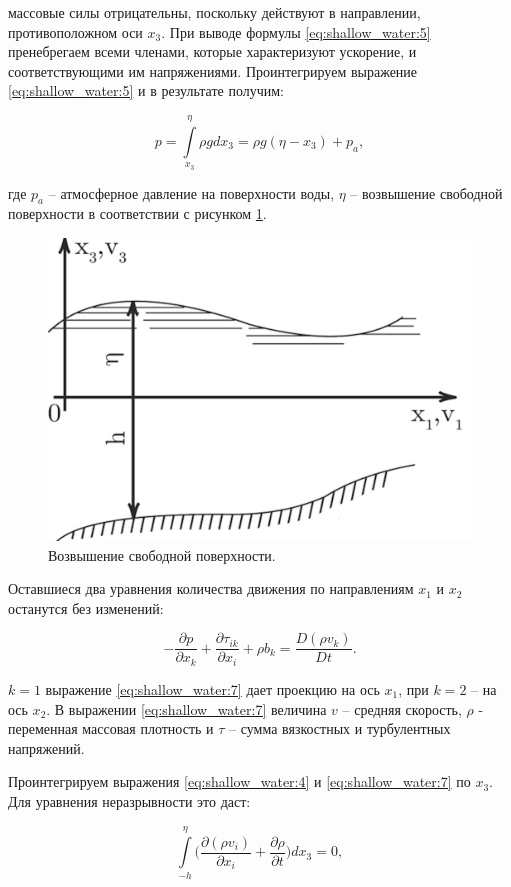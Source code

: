 \documentclass[14pt]{extreport}
\begin{document}
 массовые силы отрицательны, поскольку действуют в направлении, противоположном оси $x_3$. При выводе формулы \ref{eq:shallow_water:5} пренебрегаем всеми членами, которые характеризуют ускорение, и соответствующими им напряжениями. Проинтегрируем выражение \ref{eq:shallow_water:5} и в результате получим:

\begin{equation}\label{eq:shallow_water:6}
p = \int\limits^\eta_{x_3} \rho g dx_3 = \rho g (\eta-x_3)+p_a,
\end{equation}

\noindent где $p_a$ -- атмосферное давление на поверхности воды,
$\eta$ -- возвышение свободной поверхности в соответствии с рисунком \ref{img:shallow_water:1}.

\begin{figure}[H]
\centerline{\includegraphics[width=0.5\linewidth]{images/shallow_water_1}}
\caption{Возвышение свободной поверхности.}
\label{img:shallow_water:1}
\end{figure}

Оставшиеся два уравнения количества движения по направлениям $x_1$ и $x_2$ останутся без изменений:

\begin{equation}\label{eq:shallow_water:7}
-\frac{\partial p}{\partial x_k} + \frac{\partial \tau_{ik}}{\partial x_i} + \rho b_k = \frac{D(\rho v_k)}{Dt}.
\end{equation}

 $k=1$ выражение \ref{eq:shallow_water:7} дает проекцию на ось $x_1$, при $k=2$ -- на ось $x_2$. В выражении \ref{eq:shallow_water:7} величина $v$ -- средняя скорость, $\rho$ - переменная массовая плотность и $\tau$ -- сумма вязкостных и турбулентных напряжений.

Проинтегрируем выражения \ref{eq:shallow_water:4} и \ref{eq:shallow_water:7} по $x_3$. Для уравнения неразрывности это даст:

\begin{equation}\label{eq:shallow_water:8}
\int\limits^\eta_{-h} \bigg(\frac{\partial (\rho v_i)}{\partial x_i} + \frac{\partial \rho}{\partial t}\bigg) dx_3 =0,
\end{equation}
\end{document}
